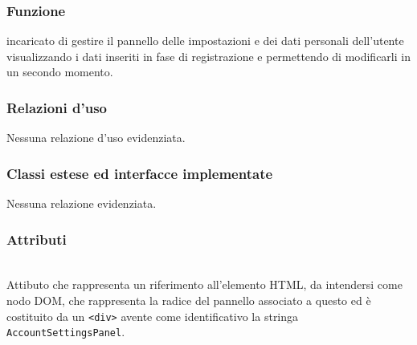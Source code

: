 \subsubsection*{Funzione}
 incaricato di gestire il pannello delle impostazioni e dei dati personali dell'utente visualizzando i dati inseriti in fase di registrazione e permettendo di modificarli in un secondo momento.

\subsubsection*{Relazioni d'uso}
Nessuna relazione d'uso evidenziata.

\subsubsection*{Classi estese ed interfacce implementate}
Nessuna relazione evidenziata.

\subsubsection*{Attributi}
\begin{description}
\item{}\\
Attibuto che rappresenta un riferimento all'elemento HTML, da intendersi come nodo DOM, che rappresenta la radice del pannello associato a questo  ed è costituito da un \verb'<div>' avente come identificativo la stringa \verb'AccountSettingsPanel'.
\end{description}

